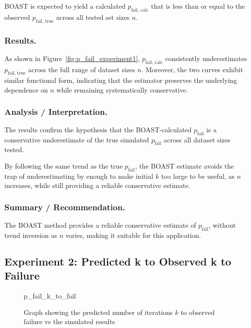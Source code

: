         BOAST is expected to yield a calculated $p_\text{fail, calc}$ that is less than or equal to the observed $p_\text{fail, true}$ across all tested set sizes $n$.

    \subsubsection{Results.}

        As shown in Figure~\ref{fig:p_fail_experiment1}, $p_{\text{fail, calc}}$ consistently underestimates $p_{\text{fail, true}}$ across the full range of dataset sizes $n$. 
        Moreover, the two curves exhibit similar functional form, indicating that the estimator preserves the underlying dependence on $n$ while remaining systematically conservative.

    \subsubsection{Analysis / Interpretation.}

        The results confirm the hypothesis that the BOAST-calculated $p_\text{fail}$ is a conservative underestimate of the true simulated $p_\text{fail}$ across all 
        dataset sizes tested.

        By following the same trend as the true $p_\text{fail}$, the BOAST estimate avoids the trap of underestimating by enough to make initial $k$ too large to be useful,
        as $n$ increases, while still providing a reliable conservative estimate.

    \subsubsection{Summary / Recommendation.}

        The BOAST method provides a reliable conservative estimate of $p_\text{fail}$, without trend inversion as $n$ varies, making it suitable for this application.

\subsection{Experiment 2: Predicted k to Observed k to Failure}
\label{sec:p_fail_experiment2}

    \begin{figure}[ht!]
        \centering
        {p_fail_k_to_fail}
        \caption{Graph showing the predicted number of iterations $k$ to observed failure vs the simulated results}
        \label{fig:p_fail_experiment2}
    \end{figure}

